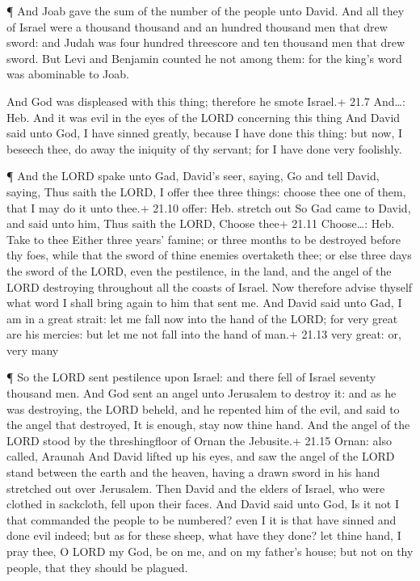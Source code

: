  ¶ And Joab gave the sum of the number of the people unto
David. And all they of Israel were a thousand thousand and an hundred
thousand men that drew sword: and Judah was four hundred threescore and
ten thousand men that drew sword.  But Levi and Benjamin
counted he not among them: for the king's word was abominable to Joab.

 And God was displeased with this thing; therefore he smote
Israel.+ 21.7 And\ldots: Heb. And it was evil in the eyes of the LORD
concerning this thing  And David said unto God, I have
sinned greatly, because I have done this thing: but now, I beseech thee,
do away the iniquity of thy servant; for I have done very foolishly.

 ¶ And the LORD spake unto Gad, David's seer, saying,
 Go and tell David, saying, Thus saith the LORD, I offer
thee three things: choose thee one of them, that I may do it unto thee.+
21.10 offer: Heb. stretch out  So Gad came to David, and
said unto him, Thus saith the LORD, Choose thee+ 21.11 Choose\ldots:
Heb. Take to thee  Either three years' famine; or three
months to be destroyed before thy foes, while that the sword of thine
enemies overtaketh thee; or else three days the sword of the LORD, even
the pestilence, in the land, and the angel of the LORD destroying
throughout all the coasts of Israel. Now therefore advise thyself what
word I shall bring again to him that sent me.  And David
said unto Gad, I am in a great strait: let me fall now into the hand of
the LORD; for very great are his mercies: but let me not fall into the
hand of man.+ 21.13 very great: or, very many

 ¶ So the LORD sent pestilence upon Israel: and there fell
of Israel seventy thousand men.  And God sent an angel unto
Jerusalem to destroy it: and as he was destroying, the LORD beheld, and
he repented him of the evil, and said to the angel that destroyed, It is
enough, stay now thine hand. And the angel of the LORD stood by the
threshingfloor of Ornan the Jebusite.+ 21.15 Ornan: also called, Araunah
 And David lifted up his eyes, and saw the angel of the
LORD stand between the earth and the heaven, having a drawn sword in his
hand stretched out over Jerusalem. Then David and the elders of Israel,
who were clothed in sackcloth, fell upon their faces.  And
David said unto God, Is it not I that commanded the people to be
numbered? even I it is that have sinned and done evil indeed; but as for
these sheep, what have they done? let thine hand, I pray thee, O LORD my
God, be on me, and on my father's house; but not on thy people, that
they should be plagued.

